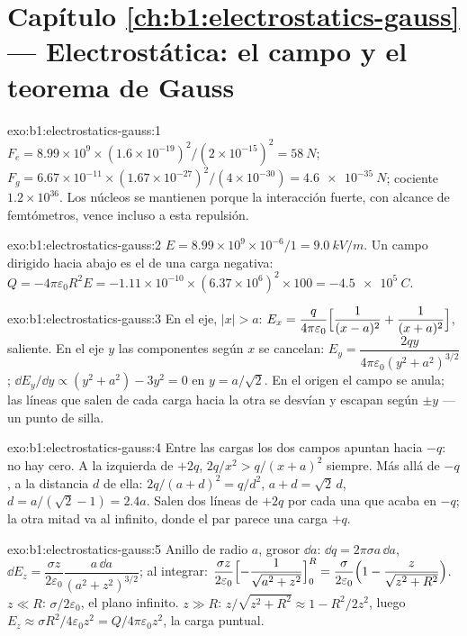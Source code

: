 \section*{Capítulo \ref{ch:b1:electrostatics-gauss} --- Electrostática: el campo y el teorema de Gauss}

\begin{solution}{exo:b1:electrostatics-gauss:1}
$F_e = 8.99 \times 10^9 \times (1.6 \times 10^{-19})^2/(2 \times 10^{-15})^2 = \qty{58}{N}$;
$F_g = 6.67 \times 10^{-11} \times (1.67 \times 10^{-27})^2/(4 \times 10^{-30}) =
\qty{4.6e-35}{N}$; cociente $1.2 \times 10^{36}$. Los núcleos se mantienen
porque la interacción fuerte, con alcance de femtómetros, vence incluso a esta repulsión.
\end{solution}

\begin{solution}{exo:b1:electrostatics-gauss:2}
$E = 8.99 \times 10^9 \times 10^{-6}/1 = \qty{9.0}{kV/m}$. Un campo dirigido
hacia abajo es el de una carga negativa: $Q = -4\pi\varepsilon_0R^2E = -1.11 \times 10^{-10} \times
(6.37 \times 10^6)^2 \times 100 = \qty{-4.5e5}{C}$.
\end{solution}

\begin{solution}{exo:b1:electrostatics-gauss:3}
En el eje, $|x| > a$: $E_x = \dfrac{q}{4\pi\varepsilon_0}\Bigl[\dfrac{1}{(x - a)^2} +
\dfrac{1}{(x + a)^2}\Bigr]$, saliente. En el eje $y$ las componentes según $x$
se cancelan: $E_y = \dfrac{2qy}{4\pi\varepsilon_0(y^2 + a^2)^{3/2}}$; $\dd E_y/\dd y \propto
(y^2 + a^2) - 3y^2 = 0$ en $y = a/\sqrt2$. En el origen el campo se anula;
las líneas que salen de cada carga hacia la otra se desvían y escapan
según $\pm y$ --- un punto de silla.
\end{solution}

\begin{solution}{exo:b1:electrostatics-gauss:4}
Entre las cargas los dos campos apuntan hacia $-q$: no hay cero. A la
izquierda de $+2q$, $2q/x^2 > q/(x + a)^2$ siempre. Más allá de $-q$, a la
distancia $d$ de ella: $2q/(a + d)^2 = q/d^2$, $a + d = \sqrt2\,d$, $d = a/(\sqrt2 - 1) = 2.4a$.
Salen dos líneas de $+2q$ por cada una que acaba en $-q$; la otra mitad va
al infinito, donde el par parece una carga $+q$.
\end{solution}

\begin{solution}{exo:b1:electrostatics-gauss:5}
Anillo de radio $a$, grosor $\dd a$: $\dd q = 2\pi\sigma a\,\dd a$, $\dd E_z =
\dfrac{\sigma z}{2\varepsilon_0}\dfrac{a\,\dd a}{(a^2 + z^2)^{3/2}}$; al integrar:
$\dfrac{\sigma z}{2\varepsilon_0}\Bigl[-\dfrac{1}{\sqrt{a^2 + z^2}}\Bigr]_0^R = \dfrac{\sigma}{2\varepsilon_0}
\Bigl(1 - \dfrac{z}{\sqrt{z^2 + R^2}}\Bigr)$. $z \ll R$: $\sigma/2\varepsilon_0$, el
plano infinito. $z \gg R$: $z/\sqrt{z^2 + R^2} \approx 1 - R^2/2z^2$, luego $E_z
\approx \sigma R^2/4\varepsilon_0z^2 = Q/4\pi\varepsilon_0z^2$, la carga puntual.
\end{solution}

